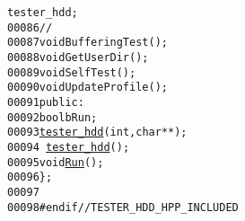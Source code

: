 \begin{footnotesize}
\begin{alltt}
      tester\_hdd; 
00086         \textcolor{comment}{//}
00087         \textcolor{keywordtype}{void} BufferingTest();
00088         \textcolor{keywordtype}{void} GetUserDir();
00089         \textcolor{keywordtype}{void} SelfTest();
00090         \textcolor{keywordtype}{void} UpdateProfile();
00091     \textcolor{keyword}{public}:
00092         \textcolor{keywordtype}{bool} bRun;
00093         \hyperlink{classtester__hdd_af43b8ca9595ed8ebf14b2c7cffe561c2}{tester_hdd}(\textcolor{keywordtype}{int},\textcolor{keywordtype}{char} **);
00094         ~\hyperlink{classtester__hdd}{tester_hdd}();
00095         \textcolor{keywordtype}{void} \hyperlink{classtester__hdd_abfdcc395e8be504dfd0ea686da790375}{Run}();
00096 \};
00097 
00098 \textcolor{preprocessor}{#endif // TESTER\_HDD\_HPP\_INCLUDED}
\end{alltt}\end{footnotesize}
